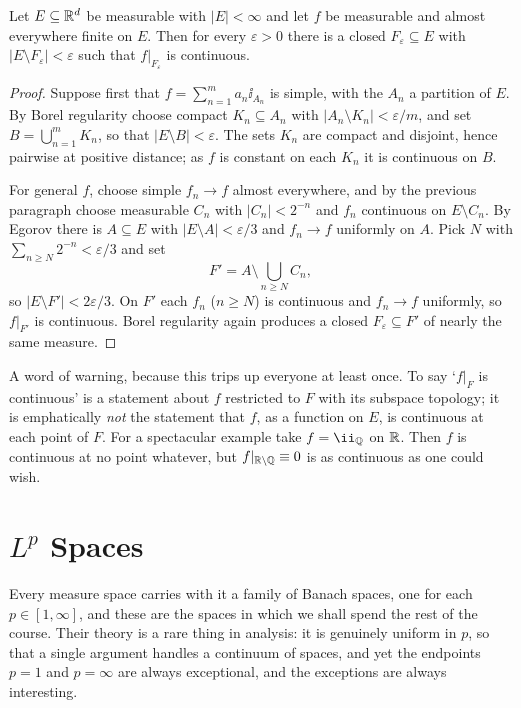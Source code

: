 \documentclass[a4paper]{scrartcl}
\begin{document}
\begin{theorem}[Lusin]\label{thm:lusin}
	Let $E \subseteq \mathbb{R}^d$ be measurable with $|E| < \infty$ and let $f$ be measurable and almost everywhere finite on $E$. Then for every $\varepsilon > 0$ there is a closed $F_\varepsilon \subseteq E$ with $|E \setminus F_\varepsilon| < \varepsilon$ such that $f|_{F_\varepsilon}$ is continuous.
\end{theorem}

\begin{proof}
	Suppose first that $f = \sum_{n=1}^m a_n \ii_{A_n}$ is simple, with the $A_n$ a partition of $E$. By Borel regularity choose compact $K_n \subseteq A_n$ with $|A_n \setminus K_n| < \varepsilon/m$, and set $B = \bigcup_{n=1}^m K_n$, so that $|E \setminus B| < \varepsilon$. The sets $K_n$ are compact and disjoint, hence pairwise at positive distance; as $f$ is constant on each $K_n$ it is continuous on $B$.

	For general $f$, choose simple $f_n \to f$ almost everywhere, and by the previous paragraph choose measurable $C_n$ with $|C_n| < 2^{-n}$ and $f_n$ continuous on $E \setminus C_n$. By Egorov there is $A \subseteq E$ with $|E \setminus A| < \varepsilon/3$ and $f_n \to f$ uniformly on $A$. Pick $N$ with $\sum_{n \ge N} 2^{-n} < \varepsilon / 3$ and set
	$$F' = A \setminus \bigcup_{n \ge N} C_n,$$
	so $|E \setminus F'| < 2\varepsilon/3$. On $F'$ each $f_n$ ($n \ge N$) is continuous and $f_n \to f$ uniformly, so $f|_{F'}$ is continuous. Borel regularity again produces a closed $F_\varepsilon \subseteq F'$ of nearly the same measure.
\end{proof}

\begin{remark}
	A word of warning, because this trips up everyone at least once. To say `$f|_F$ is continuous' is a statement about $f$ restricted to $F$ with its subspace topology; it is emphatically \emph{not} the statement that $f$, as a function on $E$, is continuous at each point of $F$. For a spectacular example take $f = \ii_\Q$ on $\mathbb{R}$. Then $f$ is continuous at no point whatever, but $f|_{\mathbb{R} \setminus \mathbb{Q}} \equiv 0$ is as continuous as one could wish.
\end{remark}

\section{\texorpdfstring{$L^p$}{Lp} Spaces}\label{sec:lp}

Every measure space carries with it a family of Banach spaces, one for each $p \in [1,\infty]$, and these are the spaces in which we shall spend the rest of the course. Their theory is a rare thing in analysis: it is genuinely uniform in $p$, so that a single argument handles a continuum of spaces, and yet the endpoints $p = 1$ and $p = \infty$ are always exceptional, and the exceptions are always interesting.
\end{document}
